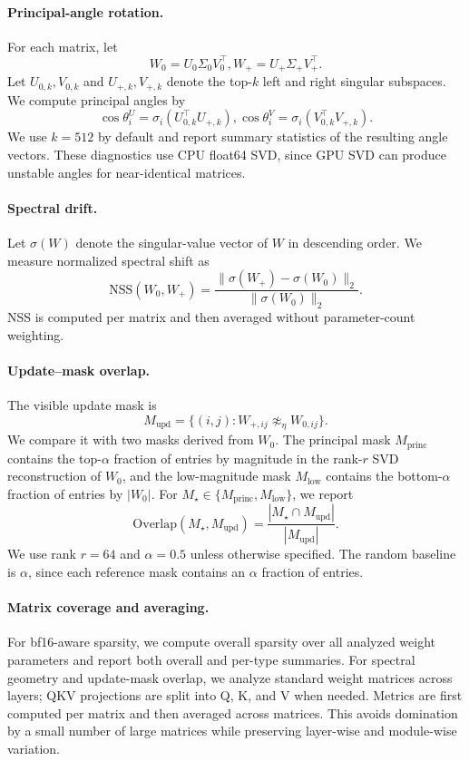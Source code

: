\paragraph{Principal-angle rotation.}
For each matrix, let
\[
    W_0 = U_0\Sigma_0V_0^\top,
    W_+ = U_+\Sigma_+V_+^\top .
\]
Let $U_{0,k},V_{0,k}$ and $U_{+,k},V_{+,k}$ denote the top-$k$ left and
right singular subspaces. We compute principal angles by
\[
    \cos\theta_i^{U}
    =
    \sigma_i(U_{0,k}^{\top}U_{+,k}),
    \cos\theta_i^{V}
    =
    \sigma_i(V_{0,k}^{\top}V_{+,k}).
\]
We use $k=512$ by default and report summary statistics of the resulting
angle vectors. These diagnostics use CPU float64 SVD, since GPU SVD can
produce unstable angles for near-identical matrices.

\paragraph{Spectral drift.}
Let $\sigma(W)$ denote the singular-value vector of $W$ in descending
order. We measure normalized spectral shift as
\[
    \mathrm{NSS}(W_0,W_+)
    =
    \frac{
    \|\sigma(W_+) - \sigma(W_0)\|_2
    }{
    \|\sigma(W_0)\|_2
    }.
\]
NSS is computed per matrix and then averaged without parameter-count
weighting.

\paragraph{Update--mask overlap.}
The visible update mask is
\[
    M_{\mathrm{upd}}
    =
    \{(i,j): W_{+,ij}\not\approx_{\eta} W_{0,ij}\}.
\]
We compare it with two masks derived from $W_0$. The principal mask
$M_{\mathrm{princ}}$ contains the top-$\alpha$ fraction of entries by
magnitude in the rank-$r$ SVD reconstruction of $W_0$, and the
low-magnitude mask $M_{\mathrm{low}}$ contains the bottom-$\alpha$ fraction
of entries by $|W_0|$. For
$M_\star\in\{M_{\mathrm{princ}},M_{\mathrm{low}}\}$, we report
\[
    \mathrm{Overlap}(M_\star,M_{\mathrm{upd}})
    =
    \frac{|M_\star\cap M_{\mathrm{upd}}|}
    {|M_{\mathrm{upd}}|}.
\]
We use rank $r=64$ and $\alpha=0.5$ unless otherwise specified. The random
baseline is $\alpha$, since each reference mask contains an $\alpha$
fraction of entries.

\paragraph{Matrix coverage and averaging.}
For bf16-aware sparsity, we compute overall sparsity over all analyzed
weight parameters and report both overall and per-type summaries. For
spectral geometry and update-mask overlap, we analyze standard weight
matrices across layers; QKV projections are split into Q, K, and V when
needed. Metrics are first computed per matrix and then averaged across
matrices. This avoids domination by a small number of large matrices while
preserving layer-wise and module-wise variation.

